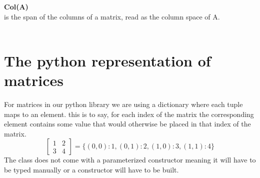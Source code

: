 \documentclass[12pt,a4paper]{article}
\newcommand{\sect}[1]{\section*{#1}}
\begin{document}
\textbf{Col(A)}\\
is the span of the columns of a matrix, read as the column space of A.\\
\\
\sect{The python representation of matrices}
For matrices in our python library we are using a dictionary where each tuple maps to an element. this is to say, for each index of the matrix the corresponding element contains some value that would otherwise be placed in that index of the matrix.
\[
  \begin{bmatrix}
    1 & 2 \\ 3 & 4
  \end{bmatrix}
  =\{ ( 0,0):1, (0,1):2,(1,0):3,(1,1):4\}
\]
The class does not come with a parameterized constructor meaning it will have to be typed manually or a constructor will have to be built. 
\end{document}

